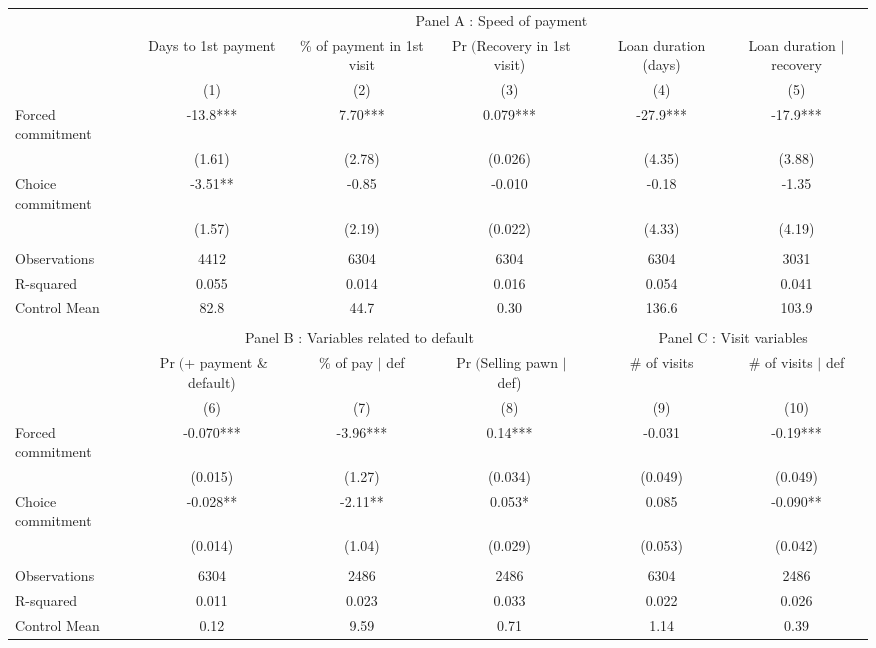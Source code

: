 \begin{tabular}{lcccccc}
\toprule
      & \multicolumn{6}{c}{Panel A  : Speed of payment} \\
\cmidrule{2-7}      & Days to 1st payment & \% of payment in 1st visit & $\Pr($Recovery in 1st visit) &       & Loan duration (days) & Loan duration $|$ recovery \\
\midrule
\midrule
      & (1)   & (2)   & (3)   &       & (4)   & (5) \\
\midrule
\midrule
Forced commitment & -13.8*** & 7.70*** & 0.079*** &       & -27.9*** & -17.9*** \\
      & (1.61) & (2.78) & (0.026) &       & (4.35) & (3.88) \\
Choice commitment & -3.51** & -0.85 & -0.010 &       & -0.18 & -1.35 \\
      & (1.57) & (2.19) & (0.022) &       & (4.33) & (4.19) \\
      &       &       &       &       &       &  \\
\midrule
Observations & 4412  & 6304  & 6304  &       & 6304  & 3031 \\
R-squared & 0.055 & 0.014 & 0.016 &       & 0.054 & 0.041 \\
Control Mean & 82.8  & 44.7  & 0.30  &       & 136.6 & 103.9 \\
\midrule
\midrule
      &       &       &       &       &       &  \\
\midrule
      & \multicolumn{3}{c}{Panel B  : Variables related to default} &       & \multicolumn{2}{c}{Panel C  : Visit variables} \\
\cmidrule{2-4}\cmidrule{6-7}      & $\Pr($+ payment \& default) & \% of pay $|$ def  & $\Pr($Selling pawn $|$ def) &       & \# of visits & \# of visits $|$ def \\
\midrule
\midrule
      & (6)   & (7)   & (8)   &       & (9)   & (10) \\
\midrule
\midrule
Forced commitment & -0.070*** & -3.96*** & 0.14*** &       & -0.031 & -0.19*** \\
      & (0.015) & (1.27) & (0.034) &       & (0.049) & (0.049) \\
Choice commitment & -0.028** & -2.11** & 0.053* &       & 0.085 & -0.090** \\
      & (0.014) & (1.04) & (0.029) &       & (0.053) & (0.042) \\
      &       &       &       &       &       &  \\
\midrule
Observations & 6304  & 2486  & 2486  &       & 6304  & 2486 \\
R-squared & 0.011 & 0.023 & 0.033 &       & 0.022 & 0.026 \\
Control Mean & 0.12  & 9.59  & 0.71  &       & 1.14  & 0.39 \\
\bottomrule
\bottomrule
\end{tabular}%
